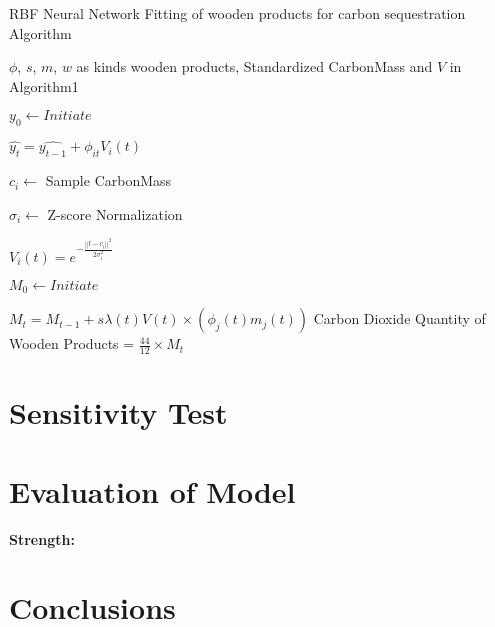 \documentclass{mcmthesis}
\numberwithin{figure}{section}
\numberwithin{table}{section}
\numberwithin{equation}{section}
\begin{document}
  \begin{algorithm}[htbp]
    \caption{RBF Neural Network Fitting of wooden products for carbon sequestration Algorithm} \label{Product Algo}
    \begin{algorithmic}[1]
        \Require
            $ \phi $, $ s $, $ m $, $ w $ as kinds wooden products, Standardized CarbonMass and $ V $ in Algorithm1 

                $ y_0 \gets Initiate $ 

                $ \hat{y_t} = \hat{y_{t-1}} + \phi_{it}V_i(t) $
            
                $ c_i\gets $ Sample CarbonMass
            
                $ \sigma_i\gets $ Z-score Normalization

                $ V_i(t) = e^{-\frac{||t-c_i||^2}{2\sigma_i^2}} $
            \EndFor

            $ M_0\gets Initiate $ 


            $ M_t = M_{t-1}+s\lambda(t)V(t)\times (\phi_j(t)m_j(t)) $ 
            \EndFor
        \EndFor
        \Ensure
        Carbon Dioxide Quantity of Wooden Products = $ \frac{44}{12} \times M_t$ 
    \end{algorithmic}
\end{algorithm}

\section{Sensitivity Test}

\section{Evaluation of Model}

\textbf{Strength:}


\section{Conclusions}



\newpage
{}
\memodate{\today}

\begin{memo}

  
\end{memo}
\end{document}
